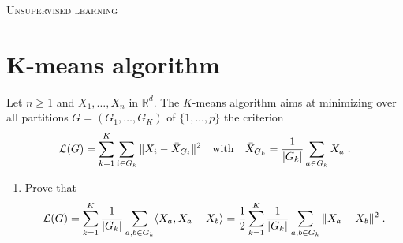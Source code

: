 \documentclass[a4paper,10pt,fleqn]{article}
\newcommand{\R}{\ensuremath{\mathbb{R}}}
\newcommand{\1}{\ensuremath{\mathbbm{1}}}
\newcommand{\crit}{\mathcal{L}}
\begin{document}
\noindent\hrulefill

\begin{center}
\textsc{Unsupervised learning}
\end{center}
\hrulefill

\medskip


\section{K-means algorithm}
Let $n\geqslant 1$ and  $X_{1},\ldots,X_{n}$ in $\R^d$.
The $K$-means algorithm aims at minimizing over all partitions $G=(G_{1},\ldots,G_{K})$ of $\{1,\ldots,p\}$ the criterion
$$
\crit(G)=\sum_{k=1}^K\sum_{i\in G_{k}}\|X_{i}-\bar{X}_{G_{i}}\|^2\quad \textrm{with}\quad \bar{X}_{G_{k}}={1\over |G_{k}|}\sum_{a\in G_{k}} X_{a}\;.
$$
\begin{enumerate}
\item Prove that
$$
\crit(G)=\sum_{k=1}^K{1\over |G_{k}|}\sum_{a,b\in G_{k}} \langle X_{a},X_{a}-X_{b}\rangle ={1\over 2}\sum_{k=1}^K{1\over |G_{k}|}\sum_{a,b\in G_{k}} \|X_{a}-X_{b}\|^2\;.
$$

\vspace{.2cm}


\end{enumerate}
\end{document}
